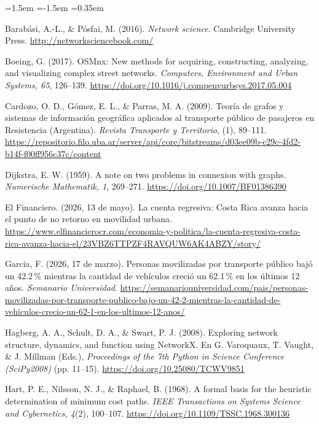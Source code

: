 \documentclass[11pt]{article}
\numberwithin{equation}{section}
\begin{document}
\small
\begin{list}{}{\leftmargin=1.5em \itemindent=-1.5em \itemsep=0.35em}

\item Barabási, A.-L., \& Pósfai, M. (2016). \textit{Network science}. Cambridge University Press. \url{http://networksciencebook.com/}

\item Boeing, G. (2017). OSMnx: New methods for acquiring, constructing, analyzing, and visualizing complex street networks. \textit{Computers, Environment and Urban Systems, 65}, 126--139. \url{https://doi.org/10.1016/j.compenvurbsys.2017.05.004}

\item Cardozo, O. D., Gómez, E. L., \& Parras, M. A. (2009). Teoría de grafos y sistemas de información geográfica aplicados al transporte público de pasajeros en Resistencia (Argentina). \textit{Revista Transporte y Territorio}, (1), 89--111. \url{https://repositorio.filo.uba.ar/server/api/core/bitstreams/d03ee09b-c29c-4fd2-b14f-f00ff956c37c/content}

\item Dijkstra, E. W. (1959). A note on two problems in connexion with graphs. \textit{Numerische Mathematik, 1}, 269--271. \url{https://doi.org/10.1007/BF01386390}

\item El Financiero. (2026, 13 de mayo). La cuenta regresiva: Costa Rica avanza hacia el punto de no retorno en movilidad urbana. \url{https://www.elfinancierocr.com/economia-y-politica/la-cuenta-regresiva-costa-rica-avanza-hacia-el/23VBZ6TTPZF4RAVQUW6AK4ABZY/story/}


\item Garcia, F. (2026, 17 de marzo). Personas movilizadas por transporte público bajó un 42.2\,\% mientras la cantidad de vehículos creció un 62.1\,\% en los últimos 12 años. \textit{Semanario Universidad}. \url{https://semanariouniversidad.com/pais/personas-movilizadas-por-transporte-publico-bajo-un-42-2-mientras-la-cantidad-de-vehiculos-crecio-un-62-1-en-los-ultimos-12-anos/}

\item Hagberg, A. A., Schult, D. A., \& Swart, P. J. (2008). Exploring network structure, dynamics, and function using NetworkX. En G. Varoquaux, T. Vaught, \& J. Millman (Eds.), \textit{Proceedings of the 7th Python in Science Conference (SciPy2008)} (pp. 11--15). \url{https://doi.org/10.25080/TCWV9851}

\item Hart, P. E., Nilsson, N. J., \& Raphael, B. (1968). A formal basis for the heuristic determination of minimum cost paths. \textit{IEEE Transactions on Systems Science and Cybernetics, 4}(2), 100--107. \url{https://doi.org/10.1109/TSSC.1968.300136}


\end{list}
\end{document}

